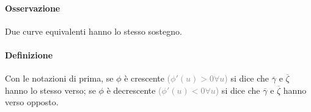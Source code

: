 \documentclass{article}
\begin{document}
\paragraph{{Osservazione}}
Due curve equivalenti hanno lo stesso sostegno.

\paragraph{{Definizione}}
Con le notazioni di prima, se $\phi$ è crescente \textcolor{grey}{($\phi'(u)>0 \forall u$)} si dice che $\overline{\gamma}$ e $\overline{\zeta}$ hanno lo stesso verso; se $\phi$ è decrescente \textcolor{grey}{($\phi'(u)<0 \forall u $)} si dice che $\overline{\gamma}$ e $\overline{\zeta}$ hanno verso opposto.

\end{document}
